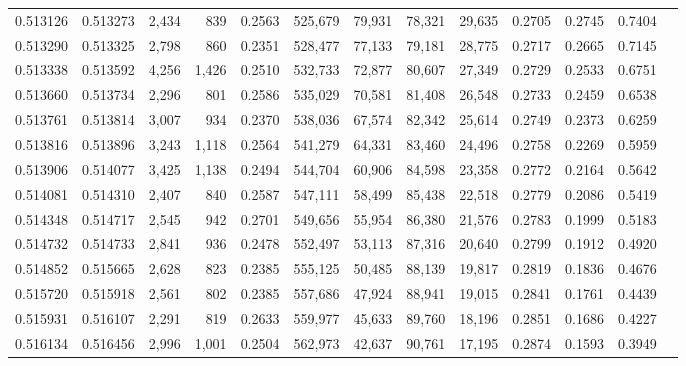 \begin{tabular}{rrrrrrrrrrrrr}
0.513126 & 0.513273 &  2,434 &   839 &                                     0.2563 & 525,679 &  79,931 &  78,321 &  29,635 & 0.2705 & 0.2745 & 0.7404 \\
0.513290 & 0.513325 &  2,798 &   860 &                                     0.2351 & 528,477 &  77,133 &  79,181 &  28,775 & 0.2717 & 0.2665 & 0.7145 \\
0.513338 & 0.513592 &  4,256 & 1,426 &                                     0.2510 & 532,733 &  72,877 &  80,607 &  27,349 & 0.2729 & 0.2533 & 0.6751 \\
0.513660 & 0.513734 &  2,296 &   801 &                                     0.2586 & 535,029 &  70,581 &  81,408 &  26,548 & 0.2733 & 0.2459 & 0.6538 \\
0.513761 & 0.513814 &  3,007 &   934 &                                     0.2370 & 538,036 &  67,574 &  82,342 &  25,614 & 0.2749 & 0.2373 & 0.6259 \\
0.513816 & 0.513896 &  3,243 & 1,118 &                                     0.2564 & 541,279 &  64,331 &  83,460 &  24,496 & 0.2758 & 0.2269 & 0.5959 \\
0.513906 & 0.514077 &  3,425 & 1,138 &                                     0.2494 & 544,704 &  60,906 &  84,598 &  23,358 & 0.2772 & 0.2164 & 0.5642 \\
0.514081 & 0.514310 &  2,407 &   840 &                                     0.2587 & 547,111 &  58,499 &  85,438 &  22,518 & 0.2779 & 0.2086 & 0.5419 \\
0.514348 & 0.514717 &  2,545 &   942 &                                     0.2701 & 549,656 &  55,954 &  86,380 &  21,576 & 0.2783 & 0.1999 & 0.5183 \\
0.514732 & 0.514733 &  2,841 &   936 &                                     0.2478 & 552,497 &  53,113 &  87,316 &  20,640 & 0.2799 & 0.1912 & 0.4920 \\
0.514852 & 0.515665 &  2,628 &   823 &                                     0.2385 & 555,125 &  50,485 &  88,139 &  19,817 & 0.2819 & 0.1836 & 0.4676 \\
0.515720 & 0.515918 &  2,561 &   802 &                                     0.2385 & 557,686 &  47,924 &  88,941 &  19,015 & 0.2841 & 0.1761 & 0.4439 \\
0.515931 & 0.516107 &  2,291 &   819 &                                     0.2633 & 559,977 &  45,633 &  89,760 &  18,196 & 0.2851 & 0.1686 & 0.4227 \\
0.516134 & 0.516456 &  2,996 & 1,001 &                                     0.2504 & 562,973 &  42,637 &  90,761 &  17,195 & 0.2874 & 0.1593 & 0.3949 \\

\end{tabular}

